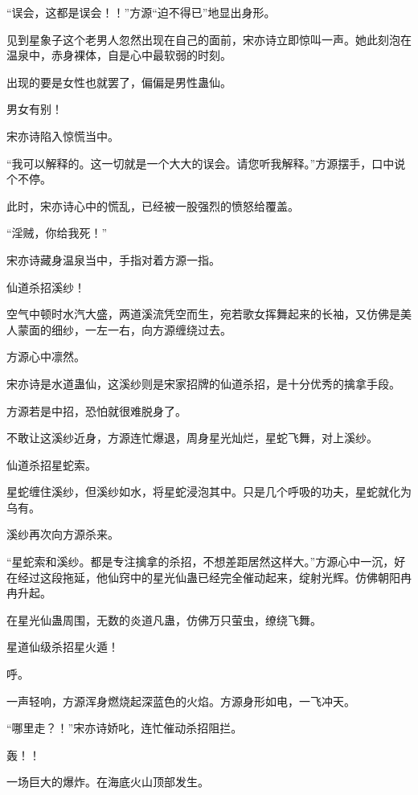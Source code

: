 
\begin{this_body}

“误会，这都是误会！！”方源“迫不得已”地显出身形。

见到星象子这个老男人忽然出现在自己的面前，宋亦诗立即惊叫一声。她此刻泡在温泉中，赤身裸体，自是心中最软弱的时刻。

出现的要是女性也就罢了，偏偏是男性蛊仙。

男女有别！

宋亦诗陷入惊慌当中。

“我可以解释的。这一切就是一个大大的误会。请您听我解释。”方源摆手，口中说个不停。

此时，宋亦诗心中的慌乱，已经被一股强烈的愤怒给覆盖。

“淫贼，你给我死！”

宋亦诗藏身温泉当中，手指对着方源一指。

仙道杀招溪纱！

空气中顿时水汽大盛，两道溪流凭空而生，宛若歌女挥舞起来的长袖，又仿佛是美人蒙面的细纱，一左一右，向方源缠绕过去。

方源心中凛然。

宋亦诗是水道蛊仙，这溪纱则是宋家招牌的仙道杀招，是十分优秀的擒拿手段。

方源若是中招，恐怕就很难脱身了。

不敢让这溪纱近身，方源连忙爆退，周身星光灿烂，星蛇飞舞，对上溪纱。

仙道杀招星蛇索。

星蛇缠住溪纱，但溪纱如水，将星蛇浸泡其中。只是几个呼吸的功夫，星蛇就化为乌有。

溪纱再次向方源杀来。

“星蛇索和溪纱。都是专注擒拿的杀招，不想差距居然这样大。”方源心中一沉，好在经过这段拖延，他仙窍中的星光仙蛊已经完全催动起来，绽射光辉。仿佛朝阳冉冉升起。

在星光仙蛊周围，无数的炎道凡蛊，仿佛万只萤虫，缭绕飞舞。

星道仙级杀招星火遁！

呼。

一声轻响，方源浑身燃烧起深蓝色的火焰。方源身形如电，一飞冲天。

“哪里走？！”宋亦诗娇叱，连忙催动杀招阻拦。

轰！！

一场巨大的爆炸。在海底火山顶部发生。


\end{this_body}
